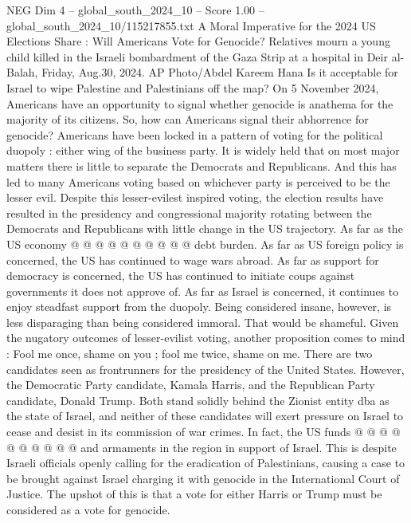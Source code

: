 \begin{textsample}{NEG Dim 4 – global\_south\_2024\_10 – Score 1.00 – global\_south\_2024\_10/115217855.txt}  \label{ex:f4_neg_073}
A Moral Imperative for the 2024 US Elections Share : Will Americans Vote for Genocide?
Relatives mourn a young child killed in the Israeli bombardment of the Gaza Strip at a hospital in Deir al-Balah, Friday, Aug.30, 2024.
AP Photo/Abdel Kareem Hana Is it acceptable for Israel to wipe Palestine and Palestinians off the map?
On 5 November 2024, Americans have an opportunity to signal whether genocide is anathema for the majority of its citizens.
So, how can Americans signal their abhorrence for genocide?
Americans have been locked in a pattern of voting for the political duopoly : either wing of the business party.
It is widely held that on most major matters there is little to separate the Democrats and Republicans.
And this has led to many Americans voting based on whichever party is perceived to be the lesser evil.
Despite this lesser-evilest inspired voting, the election results have resulted in the presidency and congressional majority rotating between the Democrats and Republicans with little change in the US trajectory.
As far as the US economy @ @ @ @ @ @ @ @ @ @ debt burden.
As far as US foreign policy is concerned, the US has continued to wage wars abroad.
As far as support for democracy is concerned, the US has continued to initiate coups against governments it does not approve of.
As far as Israel is concerned, it continues to enjoy steadfast support from the duopoly.
Being considered insane, however, is less disparaging than being considered immoral.
That would be shameful.
Given the nugatory outcomes of lesser-evilist voting, another proposition comes to mind : Fool me once, shame on you ; fool me twice, shame on me.
There are two candidates seen as frontrunners for the presidency of the United States.
However, the Democratic Party candidate, Kamala Harris, and the Republican Party candidate, Donald Trump.
Both stand solidly behind the Zionist entity dba as the state of Israel, and neither of these candidates will exert pressure on Israel to cease and desist in its commission of war crimes.
In fact, the US funds @ @ @ @ @ @ @ @ @ @ and armaments in the region in support of Israel.
This is despite Israeli officials openly calling for the eradication of Palestinians, causing a case to be brought against Israel charging it with genocide in the International Court of Justice.
The upshot of this is that a vote for either Harris or Trump must be considered as a vote for genocide.

\end{textsample}
